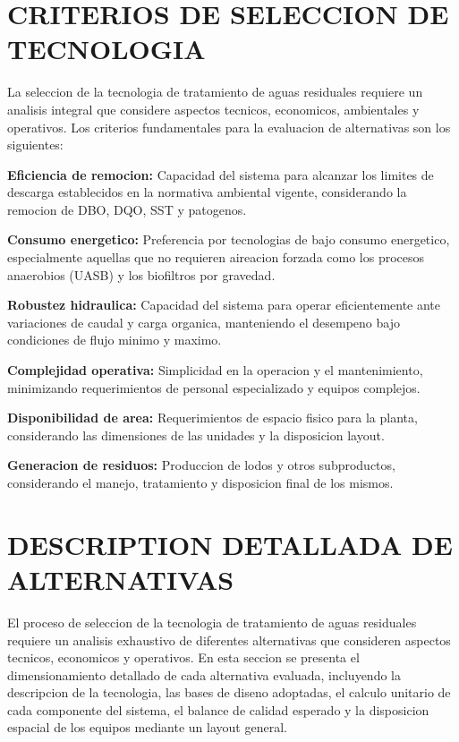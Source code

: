 \documentclass[12pt,a4paper]{article}
\begin{document}
\newpage
\section{CRITERIOS DE SELECCION DE TECNOLOGIA}

La seleccion de la tecnologia de tratamiento de aguas residuales requiere 
un analisis integral que considere aspectos tecnicos, economicos, ambientales 
y operativos. Los criterios fundamentales para la evaluacion de alternativas 
son los siguientes:

\textbf{Eficiencia de remocion:} Capacidad del sistema para alcanzar los 
limites de descarga establecidos en la normativa ambiental vigente, 
considerando la remocion de DBO, DQO, SST y patogenos.

\textbf{Consumo energetico:} Preferencia por tecnologias de bajo consumo 
energetico, especialmente aquellas que no requieren aireacion forzada como 
los procesos anaerobios (UASB) y los biofiltros por gravedad.

\textbf{Robustez hidraulica:} Capacidad del sistema para operar 
eficientemente ante variaciones de caudal y carga organica, manteniendo 
el desempeno bajo condiciones de flujo minimo y maximo.

\textbf{Complejidad operativa:} Simplicidad en la operacion y el 
mantenimiento, minimizando requerimientos de personal especializado y 
equipos complejos.

\textbf{Disponibilidad de area:} Requerimientos de espacio fisico para 
la planta, considerando las dimensiones de las unidades y la disposicion 
layout.

\textbf{Generacion de residuos:} Produccion de lodos y otros subproductos, 
considerando el manejo, tratamiento y disposicion final de los mismos.

\newpage
\section{DESCRIPTION DETALLADA DE ALTERNATIVAS}

El proceso de seleccion de la tecnologia de tratamiento de aguas residuales 
requiere un analisis exhaustivo de diferentes alternativas que consideren 
aspectos tecnicos, economicos y operativos. En esta seccion se presenta el 
dimensionamiento detallado de cada alternativa evaluada, incluyendo la 
descripcion de la tecnologia, las bases de diseno adoptadas, el calculo 
unitario de cada componente del sistema, el balance de calidad esperado y 
la disposicion espacial de los equipos mediante un layout general.
\end{document}
